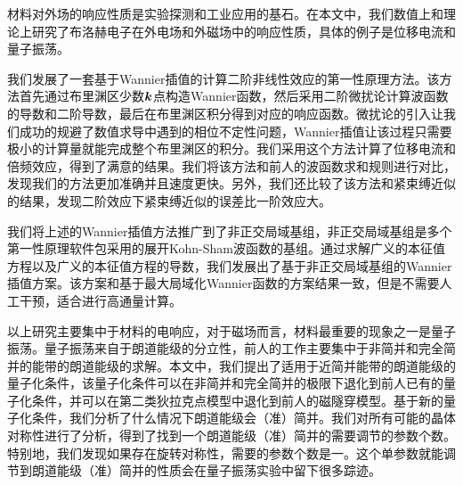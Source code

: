 \begin{cabstract}
  材料对外场的响应性质是实验探测和工业应用的基石。在本文中，我们数值上和理论上研究了布洛赫电子在外电场和外磁场中的响应性质，具体的例子是位移电流和量子振荡。

  我们发展了一套基于Wannier插值的计算二阶非线性效应的第一性原理方法。该方法首先通过布里渊区少数$\boldsymbol{k}$点构造Wannier函数，然后采用二阶微扰论计算波函数的导数和二阶导数，最后在布里渊区积分得到对应的响应函数。微扰论的引入让我们成功的规避了数值求导中遇到的相位不定性问题，Wannier插值让该过程只需要极小的计算量就能完成整个布里渊区的积分。我们采用这个方法计算了位移电流和倍频效应，得到了满意的结果。我们将该方法和前人的波函数求和规则进行对比，发现我们的方法更加准确并且速度更快。另外，我们还比较了该方法和紧束缚近似的结果，发现二阶效应下紧束缚近似的误差比一阶效应大。

  我们将上述的Wannier插值方法推广到了非正交局域基组，非正交局域基组是多个第一性原理软件包采用的展开Kohn-Sham波函数的基组。通过求解广义的本征值方程以及广义的本征值方程的导数，我们发展出了基于非正交局域基组的Wannier插值方案。该方案和基于最大局域化Wannier函数的方案结果一致，但是不需要人工干预，适合进行高通量计算。

  以上研究主要集中于材料的电响应，对于磁场而言，材料最重要的现象之一是量子振荡。量子振荡来自于朗道能级的分立性，前人的工作主要集中于非简并和完全简并的能带的朗道能级的求解。本文中，我们提出了适用于近简并能带的朗道能级的量子化条件，该量子化条件可以在非简并和完全简并的极限下退化到前人已有的量子化条件，并可以在第二类狄拉克点模型中退化到前人的磁隧穿模型。基于新的量子化条件，我们分析了什么情况下朗道能级会（准）简并。我们对所有可能的晶体对称性进行了分析，得到了找到一个朗道能级（准）简并的需要调节的参数个数。特别地，我们发现如果存在旋转对称性，需要的参数个数是一。这个单参数就能调节到朗道能级（准）简并的性质会在量子振荡实验中留下很多踪迹。
\end{cabstract}


